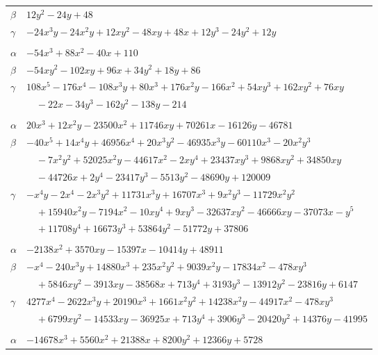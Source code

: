 \documentclass[11pt]{article}
\begin{document}
\begin{longtable}{@{}ll@{}}
$\beta$ & $12y^{2}-24y+48$\\
$\gamma$ & $-24x^{3}y-24x^{2}y+12xy^{2}-48xy+48x+12y^{3}-24y^{2}+12y$\\
\addlinespace[3pt]
\multicolumn{2}{@{}l}{$\{i,j\}=\{43,61\}$, $k_{ij}=2^{5}\cdot 13$}\\
$\alpha$ & $-54x^{3}+88x^{2}-40x+110$\\
$\beta$ & $-54xy^{2}-102xy+96x+34y^{2}+18y+86$\\
$\gamma$ & $108x^{5}-176x^{4}-108x^{3}y+80x^{3}+176x^{2}y-166x^{2}+54xy^{3}+162xy^{2}+76xy$\\
 & $\quad -22x-34y^{3}-162y^{2}-138y-214$\\
\addlinespace[3pt]
\multicolumn{2}{@{}l}{$\{i,j\}=\{43,95\}$, $k_{ij}=2^{6}\cdot 3\cdot 7\cdot 13$}\\
$\alpha$ & $20x^{3}+12x^{2}y-23500x^{2}+11746xy+70261x-16126y-46781$\\
$\beta$ & $-40x^{5}+14x^{4}y+46956x^{4}+20x^{3}y^{2}-46935x^{3}y-60110x^{3}-20x^{2}y^{3}$\\
 & $\quad -7x^{2}y^{2}+52025x^{2}y-44617x^{2}-2xy^{4}+23437xy^{3}+9868xy^{2}+34850xy$\\
 & $\quad -44726x+2y^{4}-23417y^{3}-5513y^{2}-48690y+120009$\\
$\gamma$ & $-x^{4}y-2x^{4}-2x^{3}y^{2}+11731x^{3}y+16707x^{3}+9x^{2}y^{3}-11729x^{2}y^{2}$\\
 & $\quad +15940x^{2}y-7194x^{2}-10xy^{4}+9xy^{3}-32637xy^{2}-46666xy-37073x-y^{5}$\\
 & $\quad +11708y^{4}+16673y^{3}+53864y^{2}-51772y+37806$\\
\addlinespace[3pt]
\multicolumn{2}{@{}l}{$\{i,j\}=\{43,114\}$, $k_{ij}=2^{4}\cdot 3\cdot 5\cdot 7^{2}\cdot 13$}\\
$\alpha$ & $-2138x^{2}+3570xy-15397x-10414y+48911$\\
$\beta$ & $-x^{4}-240x^{3}y+14880x^{3}+235x^{2}y^{2}+9039x^{2}y-17834x^{2}-478xy^{3}$\\
 & $\quad +5846xy^{2}-3913xy-38568x+713y^{4}+3193y^{3}-13912y^{2}-23816y+6147$\\
$\gamma$ & $4277x^{4}-2622x^{3}y+20190x^{3}+1661x^{2}y^{2}+14238x^{2}y-44917x^{2}-478xy^{3}$\\
 & $\quad +6799xy^{2}-14533xy-36925x+713y^{4}+3906y^{3}-20420y^{2}+14376y-41995$\\
\addlinespace[3pt]
\multicolumn{2}{@{}l}{$\{i,j\}=\{43,168\}$, $k_{ij}=2^{5}\cdot 7\cdot 13\cdot 19$}\\
$\alpha$ & $-14678x^{3}+5560x^{2}+21388x+8200y^{2}+12366y+5728$\\

\end{longtable}
\end{document}
